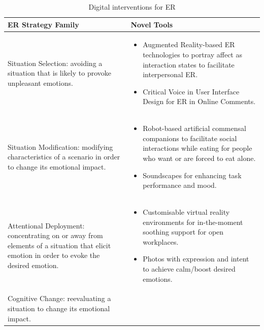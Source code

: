 \documentclass[lettersize,journal]{IEEEtran}
\begin{document}
\begin{table}[]
\centering
\caption{Digital interventions for ER\cite{smith2022digital}}
\label{tab:my-table}
\begin{tabular}{m{2.7cm}m{5cm}}
\textbf{ER Strategy Family}                                                                                                             & \textbf{Novel Tools}                                                                                                                                                                                                                                                       \\ \hline
Situation Selection: avoiding a situation that is likely to provoke unpleasant emotions.                                                 & \begin{itemize}
\item Augmented Reality-based ER technologies to portray affect as interaction states to facilitate interpersonal ER.
\item Critical Voice in User Interface Design for ER in Online Comments.
\end{itemize}                             \\ \hline
Situation Modification: modifying characteristics of a scenario in order to change its emotional impact.                                 & \begin{itemize}
\item Robot-based artificial commensal companions to facilitate social interactions while eating for people who want or are forced to eat alone. 
\item Soundscapes for enhancing task performance and mood.
\end{itemize}                 \\ \hline
Attentional Deployment: concentrating on or away from elements of a situation that elicit emotion in order to evoke the desired emotion. & \begin{itemize}
\item Customisable virtual reality environments for in-the-moment soothing support for open workplaces.
\item Photos with expression and intent to achieve calm/boost desired emotions.
\end{itemize}                                       \\ \hline
Cognitive Change: reevaluating a situation to change its emotional impact.                                                               & \begin{itemize}

\end{itemize}
\end{tabular}
\end{table}
\end{document}
